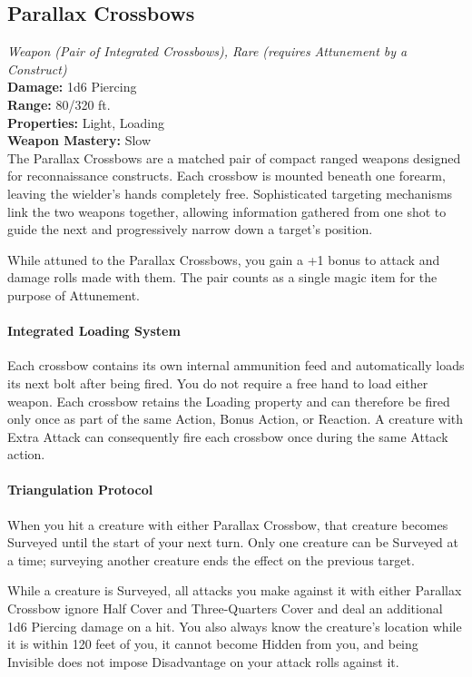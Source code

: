 \documentclass[letterpaper,openany,oneside,twocolumn]{book}
\begin{document}
\subsection*{Parallax Crossbows}
\textit{Weapon (Pair of Integrated Crossbows), Rare (requires Attunement by a Construct)}\\
\textbf{Damage:} 1d6 Piercing\\
\textbf{Range:} 80/320 ft.\\
\textbf{Properties:} Light, Loading\\
\textbf{Weapon Mastery:} Slow\\
The Parallax Crossbows are a matched pair of compact ranged weapons designed for reconnaissance constructs. Each crossbow is mounted beneath one forearm, leaving the wielder's hands completely free. Sophisticated targeting mechanisms link the two weapons together, allowing information gathered from one shot to guide the next and progressively narrow down a target's position.

While attuned to the Parallax Crossbows, you gain a +1 bonus to attack and damage rolls made with them. The pair counts as a single magic item for the purpose of Attunement.\\
\paragraph*{Integrated Loading System} Each crossbow contains its own internal ammunition feed and automatically loads its next bolt after being fired. You do not require a free hand to load either weapon. Each crossbow retains the Loading property and can therefore be fired only once as part of the same Action, Bonus Action, or Reaction. A creature with Extra Attack can consequently fire each crossbow once during the same Attack action.\\
\paragraph*{Triangulation Protocol} When you hit a creature with either Parallax Crossbow, that creature becomes Surveyed until the start of your next turn. Only one creature can be Surveyed at a time; surveying another creature ends the effect on the previous target.

While a creature is Surveyed, all attacks you make against it with either Parallax Crossbow ignore Half Cover and Three-Quarters Cover and deal an additional 1d6 Piercing damage on a hit. You also always know the creature's location while it is within 120 feet of you, it cannot become Hidden from you, and being Invisible does not impose Disadvantage on your attack rolls against it.
\end{document}
